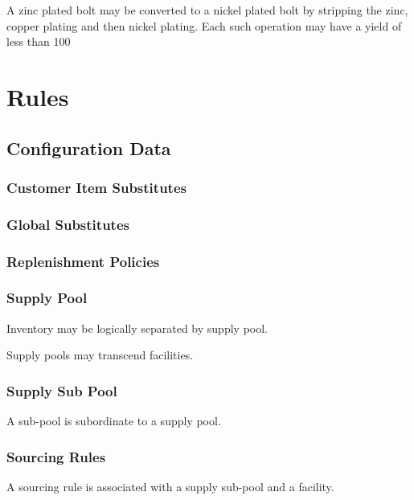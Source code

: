 \documentclass[letterpaper,10pt,english]{sphinxmanual}
\begin{document}
A zinc plated bolt may be converted to a nickel plated bolt by stripping
the zinc, copper plating and then nickel plating. Each such operation
may have a yield of less than 100


\section{Rules}
\label{APS/Functional:rules}

\subsection{Configuration Data}
\label{APS/Functional:configuration-data}

\subsubsection{Customer Item Substitutes}
\label{APS/Functional:customer-item-substitutes}

\subsubsection{Global Substitutes}
\label{APS/Functional:global-substitutes}

\subsubsection{Replenishment Policies}
\label{APS/Functional:replenishment-policies}

\subsubsection{Supply Pool}
\label{APS/Functional:supply-pool}
Inventory may be logically separated by supply pool.

Supply pools may transcend facilities.


\subsubsection{Supply Sub Pool}
\label{APS/Functional:supply-sub-pool}
A sub-pool is subordinate to a supply pool.


\subsubsection{Sourcing Rules}
\label{APS/Functional:sourcing-rules}
A sourcing rule is associated with a supply sub-pool and a facility.
\end{document}
